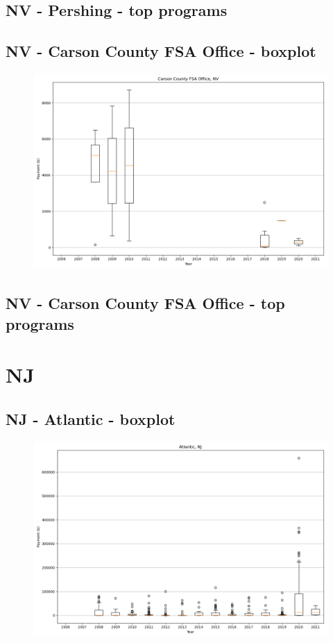 \subsection*{NV - Pershing - top programs}

\newpage
\subsection*{NV - Carson County FSA Office - boxplot}
\begin{figure}[h]
\centering
\includegraphics[width=7in]{../output/boxplots/counties/Carson County FSA Office-NV_boxplot.png}
\end{figure}


\subsection*{NV - Carson County FSA Office - top programs}

\newpage
\section*{NJ}
\subsection*{NJ - Atlantic - boxplot}
\begin{figure}[h]
\centering
\includegraphics[width=7in]{../output/boxplots/counties/Atlantic-NJ_boxplot.png}
\end{figure}


